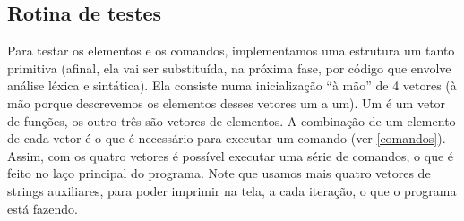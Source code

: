 \documentclass{article}
\begin{document}
\subsection{Rotina de testes}

Para testar os elementos e os comandos, implementamos uma estrutura um tanto
primitiva (afinal, ela vai ser substituída, na próxima fase, por código que
envolve análise léxica e sintática). Ela consiste numa inicialização ``à mão''
de 4 vetores (à mão porque descrevemos os elementos desses vetores um a um). Um
é um vetor de funções, os outro três são vetores de elementos. A combinação de
um elemento de cada vetor é o que é necessário para executar um comando (ver
\ref{comandos}). Assim, com os quatro vetores é possível executar uma série de
comandos, o que é feito no laço principal do programa. Note que usamos mais
quatro vetores de strings auxiliares, para poder imprimir na tela, a cada
iteração, o que o programa está fazendo.
\end{document}

